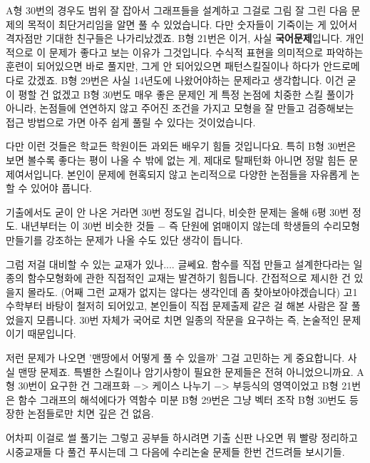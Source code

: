 A형 30번의 경우도 범위 잘 잡아서 그래프들을 설계하고 그걸로 그림 잘 그린 다음
문제의 목적이 최단거리임을 알면 풀 수 있었습니다. 다만 숫자들이 기죽이는 게 있어서 격자점만 기대한 친구들은 나가리났겠죠.
B형 21번은 이거, 사실 \textbf{국어문제}입니다. 개인적으로 이 문제가 좋다고 보는 이유가 그것입니다.
수식적 표현을 의미적으로 파악하는 훈련이 되어있으면 바로 풀지만, 그게 안 되어있으면 패턴스킬질이나 하다가 안드로메다로 갔겠죠.
B형 29번은 사실 14년도에 나왔어야하는 문제라고 생각합니다. 이건 굳이 평할 건 없겠고
B형 30번도 매우 좋은 문제인 게 특정 논점에 치중한 스킬 풀이가 아니라, 논점들에 연연하지 않고
주어진 조건을 가지고 모형을 잘 만들고 검증해보는 접근 방법으로 가면 아주 쉽게 풀릴 수 있다는 것이었습니다.
\vspace{5mm}

다만 이런 것들은 학교든 학원이든 과외든 배우기 힘들 것입니다요.
특히 B형 30번은 보면 볼수록 좋다는 평이 나올 수 밖에 없는 게, 제대로 탈패턴화 아니면 정말 힘든 문제여서입니다.
본인이 문제에 현혹되지 않고 논리적으로 다양한 논점들을 자유롭게 논할 수 있어야 풉니다.
\vspace{5mm}

기출에서도 굳이 안 나온 거라면 30번 정도일 겁니다, 비슷한 문제는 올해 6평 30번 정도.
내년부터는 이 30번 비슷한 것들 $-$ 즉 단원에 얽매이지 않는데 학생들의 수리모형 만들기를 강조하는 문제가 나올 수도 있단 생각이 듭니다.
\vspace{5mm}

그럼 저걸 대비할 수 있는 교재가 있나.... 글쎄요.
함수를 직접 만들고 설계한다라는 일종의 함수모형화에 관한 직접적인 교재는 발견하기 힘듭니다. 간접적으로 제시한 건 있을지 몰라도.
(어째 그런 교재가 없지는 않다는 생각인데 좀 찾아보아야겠습니다)
고1 수학부터 바탕이 철저히 되어있고, 본인들이 직접 문제출제 같은 걸 해본 사람은 잘 풀었을지 모릅니다.
30번 자체가 국어로 치면 일종의 작문을 요구하는 즉, 논술적인 문제이기 때문입니다.
\vspace{5mm}

저런 문제가 나오면 '맨땅에서 어떻게 풀 수 있을까' 그걸 고민하는 게 중요합니다.
사실 맨땅 문제죠. 특별한 스킬이나 암기사항이 필요한 문제들은 전혀 아니었으니까요.
A형 30번이 요구한 건 그래프화 $-$> 케이스 나누기 $-$> 부등식의 영역이었고
B형 21번은 함수 그래프의 해석에다가 역함수 미분
B형 29번은 그냥 벡터 조작
B형 30번도 등장한 논점들로만 치면 깊은 건 없음.
\vspace{5mm}

어차피 이걸로 썰 풀기는 그렇고
공부들 하시려면 기출 신판 나오면 뭐 빨랑 정리하고
시중교재들 다 풀건 푸시는데
그 다음에 수리논술 문제들 한번 건드려들 보시기들.
\vspace{5mm}


